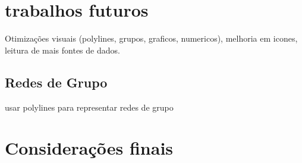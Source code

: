 \section{trabalhos futuros}
	Otimizações visuais (polylines, grupos, graficos, numericos), melhoria em icones, leitura de mais fontes de dados.
	\subsection{Redes de Grupo}
	usar polylines para representar redes de grupo
\section{Considerações finais}
